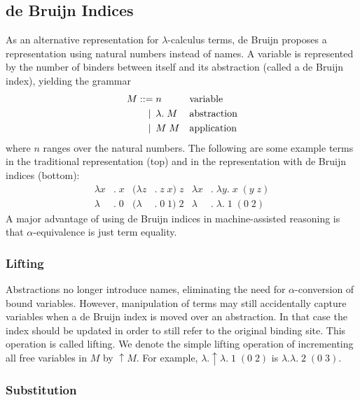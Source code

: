 \documentclass[a4paper,11pt]{article}
\begin{document}
\subsection{de Bruijn Indices}

As an alternative representation for $\lambda$-calculus terms, de Bruijn
\cite{debruijn-72} proposes a representation using natural numbers instead
of names.
A variable is represented by the number of binders between itself and its
abstraction (called a de Bruijn index), yielding the grammar
\begin{align*}
  M ::=             &\; n
  && \text{variable} \\
  \llap{\textbar\:} &\; \lambda . \; M
  && \text{abstraction} \\
  \llap{\textbar\:} &\; M \; M
  && \text{application}
\end{align*}
where $n$ ranges over the natural numbers.
The following are some example terms in the traditional representation
(top) and in the representation with de Bruijn indices (bottom):
\begin{align*}
  \lambda x&. \; x & (\lambda z&. \; z \; x) \; z & \lambda x&. \; \lambda y. \; x \; (y \; z)\\
  \lambda &. \; 0  & (\lambda &. \; 0 \; 1) \; 2  & \lambda &. \; \lambda . \; 1 \; (0 \; 2)
\end{align*}
A major advantage of using de Bruijn indices in machine-assisted
reasoning is that $\alpha$-equivalence is just term equality.

\subsubsection*{Lifting}

Abstractions no longer introduce names, eliminating the need for
$\alpha$-conversion of bound variables.
However, manipulation of terms may still accidentally capture
variables when a de Bruijn index is moved over an abstraction.
In that case the index should be updated in order to still refer to the
original binding site.
This operation is called lifting. We denote the simple lifting operation
of incrementing all free variables in $M$ by $\uparrow \! M$. For
example, $\lambda . \uparrow \! \lambda . \; 1 \; (0 \; 2)$ is
$\lambda . \lambda . \; 2 \; (0 \; 3)$.

\subsubsection*{Substitution}
\end{document}
